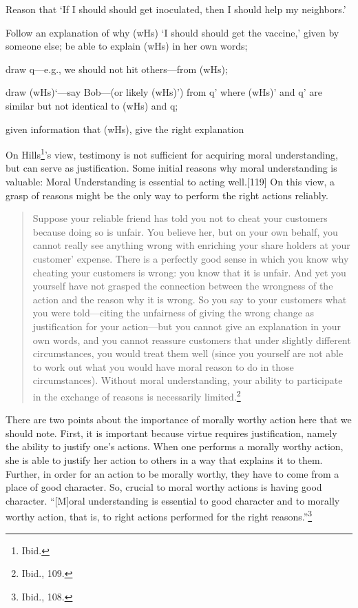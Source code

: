 \documentclass[phdthesis,12pt,final,a4paper]{wuthesis}
\theoremstyle{definition}
\theoremstyle{definition}
\theoremstyle{definition}
\theoremstyle{definition}
\theoremstyle{remark}
\begin{document}
Reason that `If I should should get inoculated, then I should help my neighbors.'

Follow an explanation of why (wHs) `I should should get the vaccine,' given by someone else; be able to explain (wHs) in her own words;

draw q---e.g., we should not hit others---from (wHs);

draw (wHs)`---say Bob---(or likely (wHs)') from q' where (wHs)' and q' are similar but not identical to (wHs) and q;

given information that (wHs), give the right explanation

On Hills\footnote{Ibid.}'s view, testimony is not sufficient for acquiring moral understanding, but can serve as justification. Some initial reasons why moral understanding is valuable: Moral Understanding is essential to acting well.{[}119{]} On this view, a grasp of reasons might be the only way to perform the right actions reliably.

\begin{quote}
Suppose your reliable friend has told you not to cheat your customers because doing so is unfair. You believe her, but on your own behalf, you cannot really see anything wrong with enriching your share holders at your customer' expense. There is a perfectly good sense in which you know why cheating your customers is wrong: you know that it is unfair. And yet you yourself have not grasped the connection between the wrongness of the action and the reason why it is wrong. So you say to your customers what you were told---citing the unfairness of giving the wrong change as justification for your action---but you cannot give an explanation in your own words, and you cannot reassure customers that under slightly different circumstances, you would treat them well (since you yourself are not able to work out what you would have moral reason to do in those circumstances). Without moral understanding, your ability to participate in the exchange of reasons is necessarily limited.\footnote{Ibid., 109.}
\end{quote}

There are two points about the importance of morally worthy action here that we should note. First, it is important because virtue requires justification, namely the ability to justify one's actions. When one performs a morally worthy action, she is able to justify her action to others in a way that explains it to them. Further, in order for an action to be morally worthy, they have to come from a place of good character. So, crucial to moral worthy actions is having good character. ``{[}M{]}oral understanding is essential to good character and to morally worthy action, that is, to right actions performed for the right reasons.''\footnote{Ibid., 108.}
\end{document}
